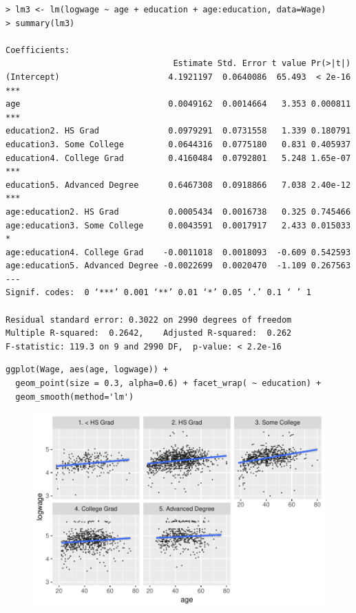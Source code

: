 \documentclass[10pt]{beamer}\usepackage[]{graphicx}\usepackage[]{color}
\begin{document}
\begin{frame}[fragile]
\scriptsize
\begin{verbatim}
> lm3 <- lm(logwage ~ age + education + age:education, data=Wage)
> summary(lm3)

Coefficients:
                                  Estimate Std. Error t value Pr(>|t|)    
(Intercept)                      4.1921197  0.0640086  65.493  < 2e-16 ***
age                              0.0049162  0.0014664   3.353 0.000811 ***
education2. HS Grad              0.0979291  0.0731558   1.339 0.180791    
education3. Some College         0.0644316  0.0775180   0.831 0.405937    
education4. College Grad         0.4160484  0.0792801   5.248 1.65e-07 ***
education5. Advanced Degree      0.6467308  0.0918866   7.038 2.40e-12 ***
age:education2. HS Grad          0.0005434  0.0016738   0.325 0.745466    
age:education3. Some College     0.0043591  0.0017917   2.433 0.015033 *  
age:education4. College Grad    -0.0011018  0.0018093  -0.609 0.542593    
age:education5. Advanced Degree -0.0022699  0.0020470  -1.109 0.267563    
---
Signif. codes:  0 ‘***’ 0.001 ‘**’ 0.01 ‘*’ 0.05 ‘.’ 0.1 ‘ ’ 1

Residual standard error: 0.3022 on 2990 degrees of freedom
Multiple R-squared:  0.2642,	Adjusted R-squared:  0.262 
F-statistic: 119.3 on 9 and 2990 DF,  p-value: < 2.2e-16
\end{verbatim}
\end{frame}

\begin{frame}[fragile]
\small
\begin{verbatim}
ggplot(Wage, aes(age, logwage)) +
  geom_point(size = 0.3, alpha=0.6) + facet_wrap( ~ education) +
  geom_smooth(method='lm')
\end{verbatim}
\begin{figure}
\includegraphics[scale=0.65]{figure/educ_age_lm_scatter.pdf}
\end{figure}
\end{frame}
\end{document}

